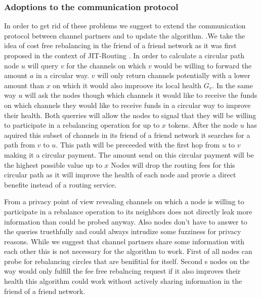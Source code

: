 \documentclass[a4paper]{paper}
\begin{document}
\subsubsection{Adoptions to the communication protocol}\label{sec:lnchanges}
In order to get rid of these problems we suggest to extend the communication protocol between channel partners and to update the algorithm.
.We take the idea of cost free rebalancing in the friend of a friend network as it was first proposed in the context of JIT-Routing \cite{pickhardt2019jit}.
In order to calculate a circular path node $u$ will query $v$ for the channels on which $v$ would be willing to forward the amount $a$ in a circular way.
$v$ will only return channels potentially with a lower amount than $x$ on which it  would also improove its local health $G_{v}$.
In the same way $u$ will ask the nodes though which channels it would like to receive the funds on which channels they would like to receive funds in a circular way to improve their health.
Both querries will allow the nodes to signal that they will be willing to participate in a rebalancing operation for up to $x$ tokens.
After the node $u$ has aquired this subset of channels in its friend of a friend network it searches for a path from $v$ to $u$.
This path will be preceeded with the first hop from $u$ to $v$ making it a circular payment.
The amount send on this circular payment will be the highest possible value up to $x$
Nodes will drop the routing fees for this circular path as it will improve the health of each node and provie a direct benefite instead of a routing service.

From a privacy point of view revealing channels on which a node is willing to participate in a rebalance operation to its neighbors does not directly leak more information than could be probed anyway.
Also nodes don't have to answer to the queries truethfully and could always intrudize some fuzziness for privacy reasons. 
While we suggest that channel partners share some information with each other this is not necessary for the algorithm to work.
First of all nodes can probe for rebalancing circles that are benifitial for itself.
Second s nodes on the way would only fulfill the fee free rebalncing request if it also improves their health this algorithm could work without actively sharing information in the friend of a friend network.
\end{document}
